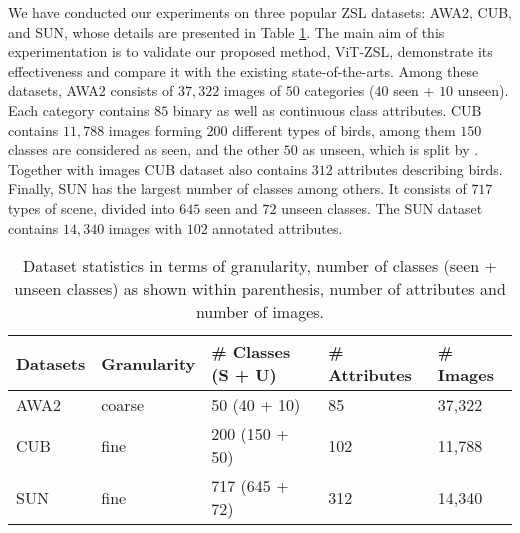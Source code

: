 \documentclass[a4paper,11pt]{article}
\newcommand{\myparagraph}[1]{\vspace{4pt}\noindent{\bf #1}}
\begin{document}

\myparagraph{Datasets:} \label{Dataset}
We have conducted our experiments on three popular ZSL datasets: AWA2, CUB, and SUN, whose details are presented in Table \ref{tab:mytab}. The main aim of this experimentation is to validate our proposed method, ViT-ZSL, demonstrate its effectiveness and compare it with the existing state-of-the-arts. Among these datasets, AWA2 \cite{AWA2:journals/corr/XianSA17} consists of $37,322$ images of $50$ categories ($40$ seen + $10$ unseen). Each category contains $85$ binary as well as continuous class attributes. CUB \cite{CUB} contains $11,788$ images forming $200$ different types of birds, among them $150$ classes are considered as seen, and the other $50$ as unseen, which is split by \cite{ALE}. Together with images CUB dataset also contains $312$ attributes describing birds. Finally, SUN \cite{SUN} has the largest number of classes among others. It consists of $717$ types of scene, divided into $645$ seen and $72$ unseen classes. The SUN dataset contains $14,340$ images with $102$ annotated attributes.
\begin{table}[!h]
\centering
\caption{Dataset statistics in terms of granularity, number of classes (seen + unseen classes) as shown within parenthesis, number of attributes and number of images.} \label{tab:mytab}
\begin{tabular}{|l|l|l|l|l|}
\hline
Datasets & Granularity & \# Classes   (S + U) & \# Attributes & \# Images  \\ \hline
AWA2 \cite{AWA2:journals/corr/XianSA17} & coarse & 50  (40 + 10)& 85  & 37,322 \\
CUB \cite{CUB} &  fine  & 200  (150 + 50) & 102  & 11,788 \\
SUN \cite{SUN} &  fine   &  717  (645 + 72) & 312 & 14,340 \\
\hline
\end{tabular}
\end{table}
\end{document}
